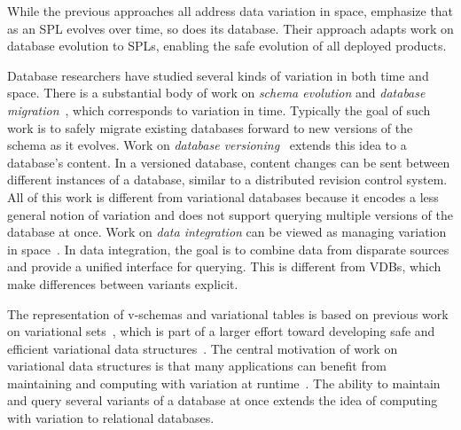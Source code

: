 While the previous approaches all address data variation in space,
\citet{dbSPLevolve} emphasize that as an SPL evolves over time, so does its
database. Their approach adapts work on database evolution to SPLs, enabling
the safe evolution of all deployed products.
%


Database researchers have studied several kinds of variation in
both time and space. There is a substantial body of work on \emph{schema
evolution} and \emph{database
migration}~\cite{Prism08Curino,prima08Moon,schEvolUnifyApp,schEvolIssues03Ram},
which corresponds to variation in time. Typically the goal of such work is to
safely migrate existing databases forward to new versions of the schema as it
evolves. 
%
Work on \emph{database versioning}~\cite{datasetVersioning,dbVersioning}
extends this idea to a database's content. In a versioned database, 
content changes can be sent between different instances of a database, similar
to a distributed revision control system.
%
All of this work is different from variational databases because it encodes a
less general notion of variation and does not support querying multiple
versions of the database at once.
%
Work on \emph{data integration} can be viewed as managing variation in
space~\cite{dataIntegBook}. In data integration, the goal is to combine data
from disparate sources and provide a unified interface for querying.
This is different from VDBs, which make differences between variants
explicit. %

The representation of v-schemas and variational tables is based on previous
work on variational sets~\cite{EWC13fosd}, which is part of a larger effort
toward developing safe and efficient variational data
structures~\cite{Walk14onward,MMWWK17vamos}. The central motivation of work on
variational data structures is that many applications can benefit from
maintaining and computing with variation at
runtime~\cite{EW11gttse,CEW16ecoop}. The ability to maintain and query several
variants of a database at once extends the idea of computing with variation to
relational databases.



